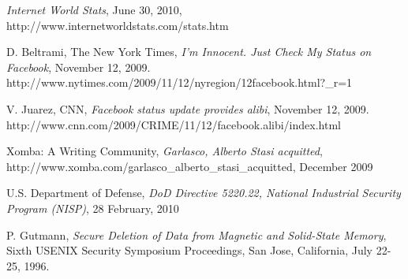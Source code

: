 \documentclass[runningheads]{llncs}
\begin{document}
\begin{thebibliography}{1}

\emph{Internet World Stats}, June 30, 2010,
http://www.internetworldstats.com/stats.htm


D. Beltrami, The New York Times, \emph{I'm Innocent. Just Check My Status on Facebook},
November 12, 2009. http://www.nytimes.com/2009/11/12/nyregion/12facebook.html?\_r=1

V. Juarez, CNN, \emph{Facebook status update provides alibi}, November 12, 2009. 
http://www.cnn.com/2009/CRIME/11/12/facebook.alibi/index.html

Xomba: A Writing Community,
\emph{Garlasco, Alberto Stasi acquitted},
http://www.xomba.com/garlasco\_alberto\_stasi\_acquitted,
December 2009




U.S. Department of Defense, \emph{DoD Directive 5220.22, National Industrial
Security Program (NISP)},
28 February, 2010

P. Gutmann, \emph{Secure Deletion of Data from Magnetic and Solid-State
Memory}, Sixth USENIX Security Symposium Proceedings, San Jose, California,
July 22-25, 1996.



\end{thebibliography}
\end{document}
